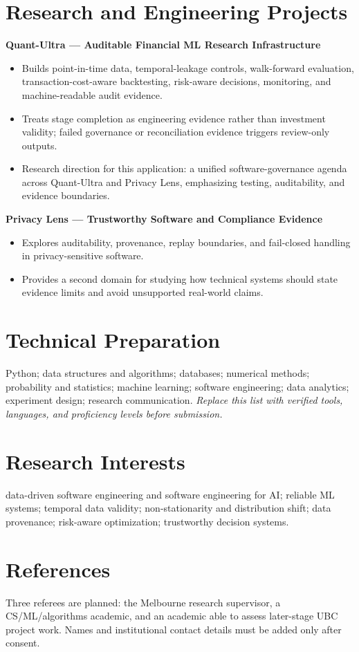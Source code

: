 \documentclass[11pt]{article}
\begin{document}
\section*{Research and Engineering Projects}
\textbf{Quant-Ultra --- Auditable Financial ML Research Infrastructure}
\begin{itemize}
\item Builds point-in-time data, temporal-leakage controls, walk-forward evaluation, transaction-cost-aware backtesting, risk-aware decisions, monitoring, and machine-readable audit evidence.
\item Treats stage completion as engineering evidence rather than investment validity; failed governance or reconciliation evidence triggers review-only outputs.
\item Research direction for this application: a unified software-governance agenda across Quant-Ultra and Privacy Lens, emphasizing testing, auditability, and evidence boundaries.
\end{itemize}

\begin{samepage}
\textbf{Privacy Lens --- Trustworthy Software and Compliance Evidence}
\begin{itemize}
\item Explores auditability, provenance, replay boundaries, and fail-closed handling in privacy-sensitive software.
\item Provides a second domain for studying how technical systems should state evidence limits and avoid unsupported real-world claims.
\end{itemize}
\end{samepage}

\section*{Technical Preparation}
Python; data structures and algorithms; databases; numerical methods; probability and statistics; machine learning; software engineering; data analytics; experiment design; research communication. \textit{Replace this list with verified tools, languages, and proficiency levels before submission.}

\section*{Research Interests}
data-driven software engineering and software engineering for AI; reliable ML systems; temporal data validity; non-stationarity and distribution shift; data provenance; risk-aware optimization; trustworthy decision systems.

\section*{References}
Three referees are planned: the Melbourne research supervisor, a CS/ML/algorithms academic, and an academic able to assess later-stage UBC project work. Names and institutional contact details must be added only after consent.
\end{document}
